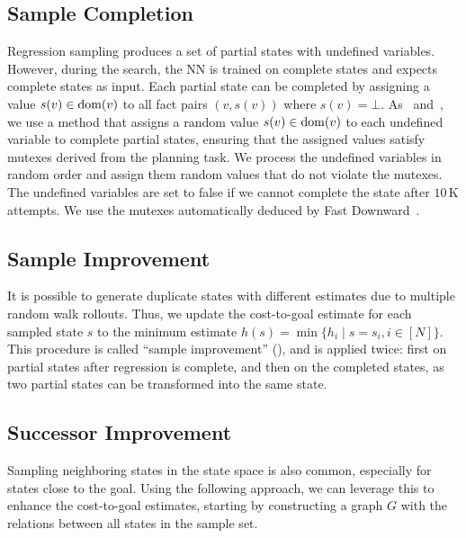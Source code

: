 \documentclass[ppgc,diss,english]{iiufrgs}
\begin{document}
\subsection{Sample Completion}
\label{sec:sample-completion}
Regression sampling produces a set of partial states with undefined variables. However, during the search, the NN is trained on complete states and expects complete states as input.
Each partial state can be completed by assigning a value $s(v)\in\operatorname{dom}(v)$ to all fact pairs $(v,s(v))$ where $s(v)=\bot$.
As~\citet{Bettker.etal/2022} and~\citet{Ferber.etal/2022}, we use a method that assigns a random value $s(v) \in \operatorname{dom}(v)$ to each undefined variable to complete partial states, ensuring that the assigned values satisfy mutexes derived from the planning task. We process the undefined variables in random order and assign them random values that do not violate the mutexes. The undefined variables are set to false if we cannot complete the state after $10$\,K attempts. We use the mutexes automatically deduced by Fast Downward~\cite{Helmert/2006,Helmert/2009}.



\subsection{Sample Improvement}
\label{sec:sample-sai}
It is possible to generate duplicate states with different estimates due to multiple random walk rollouts. Thus, we update the cost-to-goal estimate for each sampled state $s$ to the minimum estimate $h(s) = \min\{h_i \mid s=s_i, i\in[N]\}$.
This procedure is called ``sample improvement'' (\sai), and is applied twice: first on partial states after regression is complete, and then on the completed states, as two partial states can be transformed into the same state.

\subsection{Successor Improvement}
\label{sec:sample-sui}
Sampling neighboring states in the state space is also common, especially for states close to the goal. Using the following approach, we can leverage this to enhance the cost-to-goal estimates, starting by constructing a graph $G$ with the relations between all states in the sample set.
\end{document}
